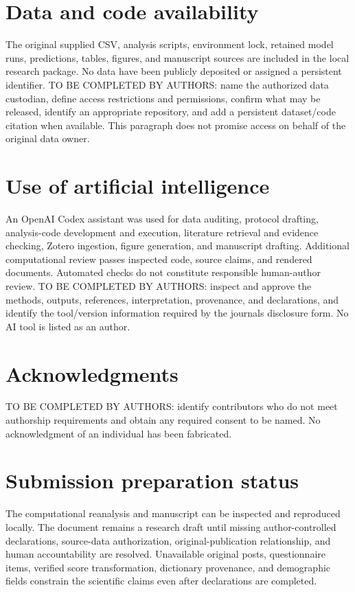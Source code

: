 \documentclass[11pt,letterpaper]{article}
\begin{document}
\section{Data and code availability}\label{data-and-code-availability}

The original supplied CSV, analysis scripts, environment lock, retained model runs, predictions, tables, figures, and manuscript sources are included in the local research package. No data have been publicly deposited or assigned a persistent identifier. TO BE COMPLETED BY AUTHORS: name the authorized data custodian, define access restrictions and permissions, confirm what may be released, identify an appropriate repository, and add a persistent dataset/code citation when available. This paragraph does not promise access on behalf of the original data owner.

\section{Use of artificial intelligence}\label{use-of-artificial-intelligence}

An OpenAI Codex assistant was used for data auditing, protocol drafting, analysis-code development and execution, literature retrieval and evidence checking, Zotero ingestion, figure generation, and manuscript drafting. Additional computational review passes inspected code, source claims, and rendered documents. Automated checks do not constitute responsible human-author review. TO BE COMPLETED BY AUTHORS: inspect and approve the methods, outputs, references, interpretation, provenance, and declarations, and identify the tool/version information required by the journal\textquotesingle s disclosure form. No AI tool is listed as an author.

\section{Acknowledgments}\label{acknowledgments}

TO BE COMPLETED BY AUTHORS: identify contributors who do not meet authorship requirements and obtain any required consent to be named. No acknowledgment of an individual has been fabricated.

\section{Submission preparation status}\label{submission-preparation-status}

The computational reanalysis and manuscript can be inspected and reproduced locally. The document remains a research draft until missing author-controlled declarations, source-data authorization, original-publication relationship, and human accountability are resolved. Unavailable original posts, questionnaire items, verified score transformation, dictionary provenance, and demographic fields constrain the scientific claims even after declarations are completed.
\end{document}
